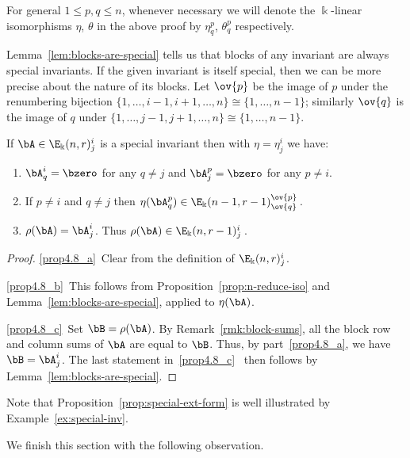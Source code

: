 \begin{rema}\label{rmk:eta-theta}
For general $1 \le p,q \le n$, whenever necessary we
will denote the $\Bbbk$-linear isomorphisms $\eta$, $\theta$ in the
above proof by $\eta^p_q$, $\theta^p_q$ respectively. 
\end{rema}

Lemma~\ref{lem:blocks-are-special} tells us that blocks of any
invariant are always special invariants. If the given invariant is
itself special, then we can be more precise about the nature of its
blocks. Let $\ov{p}$ be the image of $p$ under the renumbering
bijection $\{1, \dots, i-1, i+1, \dots, n\} \cong \{1, \dots, n-1\}$;
similarly $\ov{q}$ is the image of $q$ under $\{1, \dots, j-1, j+1,
\dots, n\} \cong \{1, \dots, n-1\}$.

\begin{prop}\label{prop:special-ext-form}
 If $\bA \in \E_\Bbbk(n,r)^i_j$ is a special invariant then with
 $\eta = \eta^i_j$ we have:
 \begin{enumerate}[label=(\alph*)]
 \item\label{prop4.8_a} $\bA^i_q = \bzero$ for any $q \ne j$ and $\bA^p_j = \bzero$ for
 any $p \ne i$.
 \item\label{prop4.8_b} If $p \ne i$ and $q \ne j$ then $\eta(\bA^p_q) \in
 \E_\Bbbk(n-1,r-1)^{\ov{p}}_{\ov{q}}$\,. 
 \item\label{prop4.8_c} $\rho(\bA) = \bA^i_j$. Thus $\rho(\bA) \in
 \E_\Bbbk(n,r-1)^i_j$\,.
 \end{enumerate}
\end{prop}

\begin{proof}
\ref{prop4.8_a}~Clear from the definition of $\E_\Bbbk(n,r)^i_j$.

\ref{prop4.8_b}~This follows from Proposition~\ref{prop:n-reduce-iso} and Lemma~\ref{lem:blocks-are-special}, applied to $\eta(\bA)$.

\ref{prop4.8_c}~Set $\bB = \rho(\bA)$. By Remark~\ref{rmk:block-sums}, all the
 block row and column sums of $\bA$ are equal to $\bB$. Thus, by part~\ref{prop4.8_a}, 
 we have $\bB = \bA^i_j$. The last statement in~\ref{prop4.8_c}~ then follows
 by Lemma~\ref{lem:blocks-are-special}.
\end{proof}

Note that Proposition~\ref{prop:special-ext-form} is well illustrated
by Example~\ref{ex:special-inv}.



We finish this section with the following observation. 

